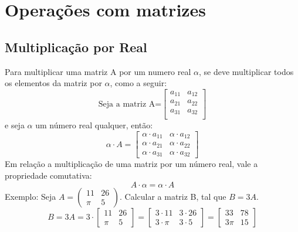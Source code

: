\section{Operações com matrizes}
\subsection{Multiplicação por Real}
Para multiplicar uma matriz A por um numero real $\alpha$, se deve multiplicar todos os elementos da matriz por $\alpha$, como a seguir:
\begin{displaymath}
\text{Seja a matriz A=}
\begin{bmatrix}
  a_{11} & a_{12}\\ a_{21} & a_{22}\\ a_{31} & a_{32}\\
\end{bmatrix}
\end{displaymath}
e seja $\alpha$ um número real qualquer, então:
\begin{displaymath}
\alpha \cdot A = \begin{bmatrix}
  \alpha \cdot a_{11} &\alpha \cdot  a_{12}\\ \alpha \cdot a_{21} &\alpha \cdot  a_{22}\\
  \alpha \cdot a_{31} & \alpha \cdot a_{32} \end{bmatrix}
\end{displaymath}
Em relação a multiplicação de uma matriz por um número real, vale a propriedade comutativa: \[A \cdot \alpha = \alpha \cdot A \]
Exemplo: Seja $ A= \left( \begin{smallmatrix} 11 & 26 \\ \pi & 5
\end{smallmatrix} \right)$. Calcular a matriz B, tal que $B=3A$.
\begin{displaymath}
B=3A=3 \cdot
  \begin{bmatrix}
    11 & 26 \\ \pi & 5
  \end{bmatrix}
  =
  \begin{bmatrix}
    3 \cdot 11 & 3 \cdot 26 \\ 3 \cdot \pi & 3 \cdot 5
  \end{bmatrix}
  =
  \begin{bmatrix}
    33 & 78 \\ 3\pi & 15
  \end{bmatrix}
\end{displaymath}

